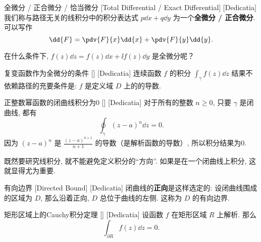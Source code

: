\documentclass[UTF8]{ctexart}
\begin{document}
        \begin{dfn}
            [ExactDifferential]
            {全微分 / 正合微分 / 恰当微分}
            [Total Differential / Exact Differential]
            [Dedicatia]
            我们称与路径无关的线积分中的积分表达式 \(p\dd{x}+q\dd{y}\) 为一个\textbf{全微分 / 正合微分}. 可以写作
            \[\dd{F}=\pdv{F}{x}\dd{x}+\pdv{F}{y}\dd{y}.\]
        \end{dfn}

        在什么条件下,  \(f(z)\dd{z}=f(z)\dd{x}+\ii f(z)\dd{y}\) 是全微分呢？

        \begin{crl}
            [UUID]
            {复变函数作为全微分的条件}
            []
            [Dedicatia]
            连续函数 \(f\) 的积分 \(\int_\gamma f(z)\dd{z}\) 结果不依赖路径的充要条件是:  \(f\) 是定义域 \(D\) 上的 的导数. 
        \end{crl}

        \begin{xmp}
            [UUID]
            {正整数幂函数的闭曲线积分为0}
            []
            [Dedicatia]
            对于所有的整数 \(n\geqslant 0\), 只要 \(\gamma\) 是闭曲线, 都有
            \[\oint_\gamma (z-a)^n\dd{z}=0.\]
            因为 \((z-a)^n\) 是 \(\frac{(z-a)^{n+1}}{n+1}\) 的导数（是解析函数的导数）, 所以积分结果为0. 
        \end{xmp}

        既然要研究线积分, 就不能避免定义积分的“方向”. 如果是在一个闭曲线上积分, 这就显得尤为重要. 

        \begin{dfn}
            [UUID]
            {有向边界}
            [Directed Bound]
            [Dedicatia]
            闭曲线的\textbf{正向}是这样选定的: 设闭曲线围成的区域为 \(D\), 那么沿着正向,  \(D\) 总位于曲线的左侧. 这称为 \(D\) 的有向边界. 
        \end{dfn}

        \begin{thm}
            [UUID]
            {矩形区域上的Cauchy积分定理}
            []
            [Dedicatia]
            设函数 \(f\) 在矩形区域 \(R\) 上解析. 那么
            \[\int_{\partial R}f(z)\dd{z}=0.\]
        \end{thm}
\end{document}
